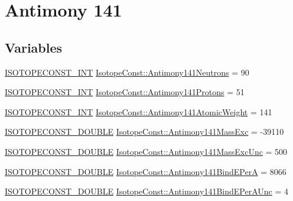\hypertarget{group___isotope_const-_antimony-_sb141}{}\section{Antimony 141}
\label{group___isotope_const-_antimony-_sb141}
\subsection*{Variables}
\begin{DoxyCompactItemize}
\item 
\mbox{\hyperlink{group___isotope_const-_macros_ga5f18360b3e99483a35c32d789e62621c}{I\+S\+O\+T\+O\+P\+E\+C\+O\+N\+S\+T\+\_\+\+I\+NT}} \mbox{\hyperlink{group___isotope_const-_antimony-_sb141_gafe6ce650c870d1fc076a7fe06c861a8a}{Isotope\+Const\+::\+Antimony141\+Neutrons}} = 90
\item 
\mbox{\hyperlink{group___isotope_const-_macros_ga5f18360b3e99483a35c32d789e62621c}{I\+S\+O\+T\+O\+P\+E\+C\+O\+N\+S\+T\+\_\+\+I\+NT}} \mbox{\hyperlink{group___isotope_const-_antimony-_sb141_gaacfc03e2b45d52a170a194e42678b988}{Isotope\+Const\+::\+Antimony141\+Protons}} = 51
\item 
\mbox{\hyperlink{group___isotope_const-_macros_ga5f18360b3e99483a35c32d789e62621c}{I\+S\+O\+T\+O\+P\+E\+C\+O\+N\+S\+T\+\_\+\+I\+NT}} \mbox{\hyperlink{group___isotope_const-_antimony-_sb141_gaf54f06ed33046d545e7c7581e4676686}{Isotope\+Const\+::\+Antimony141\+Atomic\+Weight}} = 141
\item 
\mbox{\hyperlink{group___isotope_const-_macros_ga8f45a7272ce02c0b4c65c44636ed719a}{I\+S\+O\+T\+O\+P\+E\+C\+O\+N\+S\+T\+\_\+\+D\+O\+U\+B\+LE}} \mbox{\hyperlink{group___isotope_const-_antimony-_sb141_ga37d1d6a9b49717ce45fce26d493c6e30}{Isotope\+Const\+::\+Antimony141\+Mass\+Exc}} = -\/39110
\item 
\mbox{\hyperlink{group___isotope_const-_macros_ga8f45a7272ce02c0b4c65c44636ed719a}{I\+S\+O\+T\+O\+P\+E\+C\+O\+N\+S\+T\+\_\+\+D\+O\+U\+B\+LE}} \mbox{\hyperlink{group___isotope_const-_antimony-_sb141_ga685cc2fc210fbb25879024a1059c068b}{Isotope\+Const\+::\+Antimony141\+Mass\+Exc\+Unc}} = 500
\item 
\mbox{\hyperlink{group___isotope_const-_macros_ga8f45a7272ce02c0b4c65c44636ed719a}{I\+S\+O\+T\+O\+P\+E\+C\+O\+N\+S\+T\+\_\+\+D\+O\+U\+B\+LE}} \mbox{\hyperlink{group___isotope_const-_antimony-_sb141_ga2de25f4c39e097ca63f3853b6a9889b0}{Isotope\+Const\+::\+Antimony141\+Bind\+E\+PerA}} = 8066
\item 
\mbox{\hyperlink{group___isotope_const-_macros_ga8f45a7272ce02c0b4c65c44636ed719a}{I\+S\+O\+T\+O\+P\+E\+C\+O\+N\+S\+T\+\_\+\+D\+O\+U\+B\+LE}} \mbox{\hyperlink{group___isotope_const-_antimony-_sb141_ga1f254a06fb9a34e2de7b978a3fd2915e}{Isotope\+Const\+::\+Antimony141\+Bind\+E\+Per\+A\+Unc}} = 4

\end{DoxyCompactItemize}
